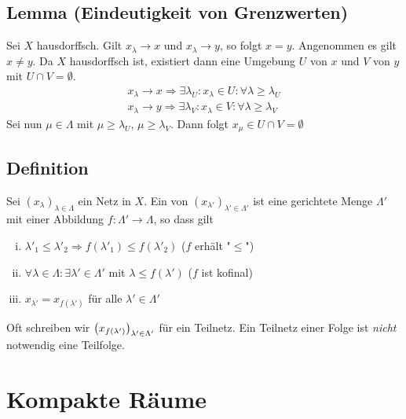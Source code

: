 \subsection[Lemma: In Hausdorffräumen sind Grenzwerte konvergenter Netze eindeutig]{Lemma (Eindeutigkeit von Grenzwerten)} %
\label{sub:35}
Sei $X$ hausdorffsch. Gilt $x_\lambda  \longrightarrow x$ und $x_\lambda \longrightarrow y$, so folgt $x=y$.
Angenommen es gilt $x \not= y$. Da $X$ hausdorffsch ist, existiert dann eine Umgebung $U$ von $x$ und $V$ von $y$ mit $U \cap V = \emptyset$. 
\begin{gather}
	x_\lambda \to x \Rightarrow \exists \lambda_U : x_\lambda  \in U : \forall \lambda \ge \lambda_U \\
	x_\lambda \to y \Rightarrow \exists \lambda_V : x_\lambda  \in V : \forall \lambda \ge \lambda_V 
\end{gather}
Sei nun $\mu \in \Lambda$ mit $\mu \ge \lambda_U$, $\mu \ge \lambda_V$. Dann folgt $x_\mu \in U\cap V = \emptyset$ \light \bewende

\subsection[Definition: Teilnetz]{Definition} %
\label{sub:36}
Sei $(x_\lambda)_{\lambda  \in \Lambda}$ ein Netz in $X$. Ein  von $(x_{\lambda'} )_{\lambda'  \in \Lambda'}$ ist eine gerichtete Menge $\Lambda'$ mit einer
Abbildung $f : \Lambda' \to \Lambda$, so dass gilt
\begin{enumerate}[i)]
	\item $\lambda'_1 \le \lambda'_2 \Rightarrow f(\lambda'_1) \le f(\lambda'_2)$ \hfill ($f$ erhält "$\le$")
	\item $\forall \lambda \in \Lambda : \exists \lambda' \in \Lambda'$ mit $\lambda  \le f(\lambda' )$ \hfill ($f$ ist kofinal)
	\item $x_{\lambda'} = x_{f(\lambda')}$ für alle $\lambda ' \in \Lambda'$
\end{enumerate}
Oft schreiben wir $\enbrace*{x_{f(\lambda')}}_{\lambda' \in \Lambda'}$ für ein Teilnetz.
Ein Teilnetz einer Folge ist \emph{nicht} notwendig eine Teilfolge.
\newpage

\section{Kompakte Räume} %
\label{sec:4}

